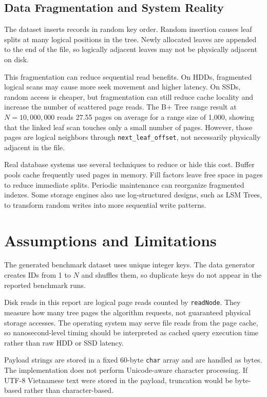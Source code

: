 \documentclass[12pt,a4paper]{article}
\begin{document}
\subsection{Data Fragmentation and System Reality}

The dataset inserts records in random key order. Random insertion causes leaf splits at many logical positions in the tree. Newly allocated leaves are appended to the end of the file, so logically adjacent leaves may not be physically adjacent on disk.

This fragmentation can reduce sequential read benefits. On HDDs, fragmented logical scans may cause more seek movement and higher latency. On SSDs, random access is cheaper, but fragmentation can still reduce cache locality and increase the number of scattered page reads. The B+ Tree range result at $N=10{,}000{,}000$ reads 27.55 pages on average for a range size of 1,000, showing that the linked leaf scan touches only a small number of pages. However, those pages are logical neighbors through \texttt{next\_leaf\_offset}, not necessarily physically adjacent in the file.

Real database systems use several techniques to reduce or hide this cost. Buffer pools cache frequently used pages in memory. Fill factors leave free space in pages to reduce immediate splits. Periodic maintenance can reorganize fragmented indexes. Some storage engines also use log-structured designs, such as LSM Trees, to transform random writes into more sequential write patterns.

\section{Assumptions and Limitations}

The generated benchmark dataset uses unique integer keys. The data generator creates IDs from 1 to $N$ and shuffles them, so duplicate keys do not appear in the reported benchmark runs.

Disk reads in this report are logical page reads counted by \texttt{readNode}. They measure how many tree pages the algorithm requests, not guaranteed physical storage accesses. The operating system may serve file reads from the page cache, so nanosecond-level timing should be interpreted as cached query execution time rather than raw HDD or SSD latency.

Payload strings are stored in a fixed 60-byte \texttt{char} array and are handled as bytes. The implementation does not perform Unicode-aware character processing. If UTF-8 Vietnamese text were stored in the payload, truncation would be byte-based rather than character-based.
\end{document}
